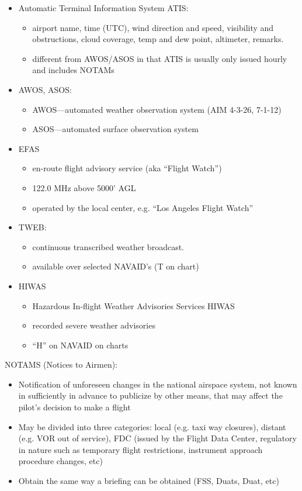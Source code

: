 \begin{itemize}
  \item Automatic Terminal Information System ATIS:
    \begin{itemize}
      \item airport name, time (UTC), wind direction and speed, visibility and
        obstructions, cloud coverage, temp and dew point, altimeter, remarks.
      \item different from AWOS/ASOS in that ATIS is usually only issued hourly
        and includes NOTAMs
    \end{itemize}
  \item AWOS, ASOS:
    \begin{itemize}
      \item AWOS—automated weather observation system (AIM 4-3-26, 7-1-12)
      \item ASOS—automated surface observation system
    \end{itemize}
  \item EFAS
    \begin{itemize}
      \item en-route flight advisory service (aka ``Flight Watch'')
      \item 122.0 MHz above 5000' AGL
      \item operated by the local center, e.g. ``Los Angeles Flight Watch''
    \end{itemize}
  \item TWEB:
    \begin{itemize}
      \item continuous transcribed weather broadcast.
      \item available over selected NAVAID's (T on chart)
    \end{itemize}
  \item HIWAS
    \begin{itemize}
      \item Hazardous In-flight Weather Advisories Services HIWAS
      \item recorded severe weather advisories
      \item ``H'' on NAVAID on charts
    \end{itemize}
\end{itemize}

NOTAMS (Notices to Airmen):

\begin{itemize}
  \item Notification of unforeseen changes in the national airspace system, not
    known in sufficiently in advance to publicize by other means, that may
    affect the pilot's decision to make a flight

  \item May be divided into three categories: local (e.g. taxi way closures),
    distant (e.g. VOR out of service), FDC (issued by the Flight Data Center,
    regulatory in nature such as temporary flight restrictions, instrument
    approach procedure changes, etc)

  \item Obtain the same way a briefing can be obtained (FSS, Duats, Duat, etc)
\end{itemize}

